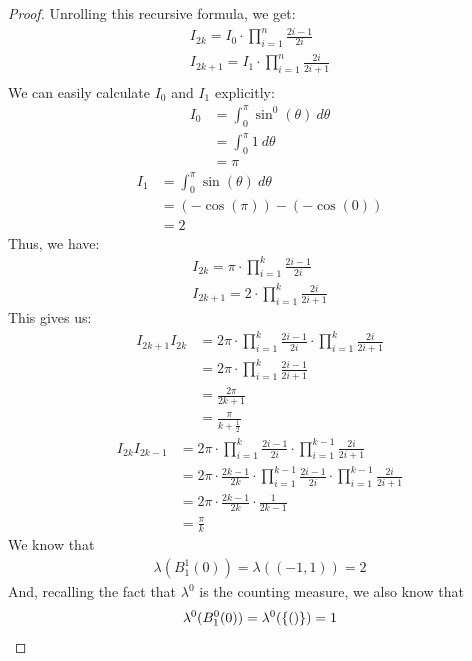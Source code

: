 \begin{proof}
	Unrolling this recursive formula, we get:
	\begin{align*}
		I_{2k} = I_0 \cdot \prod_{i = 1}^n \frac{2i - 1}{2i}\\
		I_{2k+1} = I_1 \cdot \prod_{i = 1}^n \frac{2i}{2i+1}\\
	\end{align*}
	We can easily calculate $I_0$ and $I_1$ explicitly:
	\begin{align*}
		I_0 
		&= \int_{0}^\pi \sin^0(\theta) ~d\theta\\
		&= \int_{0}^\pi 1 ~d\theta\\
		&= \pi
	\end{align*}
	\begin{align*}
		I_1 
		&= \int_{0}^\pi \sin(\theta) ~d\theta\\
		&= (-\cos(\pi)) - (-\cos(0))\\
		&= 2
	\end{align*}
	Thus, we have:
	\begin{align*}
		I_{2k} = \pi \cdot \prod_{i = 1}^k \frac{2i - 1}{2i}\\
		I_{2k+1} = 2 \cdot \prod_{i = 1}^k \frac{2i}{2i+1}
	\end{align*}
	This gives us:
	\begin{align*}
		I_{2k+1}I_{2k} 
		&= 2\pi \cdot \prod_{i = 1}^k \frac{2i - 1}{2i} \cdot \prod_{i = 1}^k \frac{2i}{2i+1}\\
		&= 2\pi \cdot \prod_{i = 1}^k \frac{2i - 1}{2i+1}\\
		&= \frac{2\pi}{2k+1}\\
		&= \frac{\pi}{k + \frac{1}{2}}
	\end{align*}
	\begin{align*}
		I_{2k}I_{2k-1} 
		&= 2\pi \cdot \prod_{i = 1}^k \frac{2i - 1}{2i} \cdot \prod_{i = 1}^{k-1} \frac{2i}{2i+1}\\
		&= 2\pi \cdot \frac{2k - 1}{2k} \cdot \prod_{i = 1}^{k-1} \frac{2i - 1}{2i} \cdot \prod_{i = 1}^{k-1} \frac{2i}{2i+1}\\
		&= 2\pi \cdot \frac{2k - 1}{2k} \cdot \frac{1}{2k-1}\\
		&= \frac{\pi}{k}
	\end{align*}
	We know that 
	\begin{align*}
		\lambda(B_1^1(0)) = \lambda((-1,1)) = 2
	\end{align*}
	And, recalling the fact that $\lambda^0$ is the counting measure, we also know that \begin{align*}
		\lambda^0(B_1^0(0)) = \lambda^0(\qty{()}) = 1
	\end{align*}

\end{proof}
